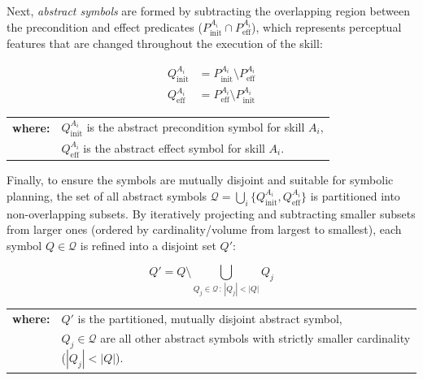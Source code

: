 Next, \textit{abstract symbols} are formed by subtracting the overlapping region between the precondition and effect predicates ($P_{\text{init}}^{A_i} \cap P_{\text{eff}}^{A_i}$), which represents perceptual features that are changed throughout the execution of the skill:

\begin{align}
    Q_{\text{init}}^{A_i} &= P_{\text{init}}^{A_i} \setminus P_{\text{eff}}^{A_i} \label{eq:sym_init} \\
    Q_{\text{eff}}^{A_i} &= P_{\text{eff}}^{A_i} \setminus P_{\text{init}}^{A_i} \label{eq:sym_eff}
\end{align}
\noindent\small
\begin{tabularx}{\textwidth}{@{}l@{\hskip 6pt}X}
    \textbf{where:} & $Q_{\text{init}}^{A_i}$ is the abstract precondition symbol for skill $A_i$, \\
                    & $Q_{\text{eff}}^{A_i}$ is the abstract effect symbol for skill $A_i$.
\end{tabularx}
\normalsize

Finally, to ensure the symbols are mutually disjoint and suitable for symbolic planning, the set of all abstract symbols $\mathcal{Q} = \bigcup_{i} \{Q_{\text{init}}^{A_i}, Q_{\text{eff}}^{A_i}\}$ is partitioned into non-overlapping subsets. By iteratively projecting and subtracting smaller subsets from larger ones (ordered by cardinality/volume from largest to smallest), each symbol $Q \in \mathcal{Q}$ is refined into a disjoint set $Q'$:

\begin{equation} \label{eq:partition}
    Q' = Q \setminus \bigcup_{Q_j \in \mathcal{Q} \,:\, |Q_j| < |Q|} Q_j
\end{equation}
\noindent\small
\begin{tabularx}{\textwidth}{@{}l@{\hskip 6pt}X}
    \textbf{where:} & $Q'$ is the partitioned, mutually disjoint abstract symbol, \\
                    & $Q_j \in \mathcal{Q}$ are all other abstract symbols with strictly smaller cardinality ($|Q_j| < |Q|$).
\end{tabularx}
\normalsize

